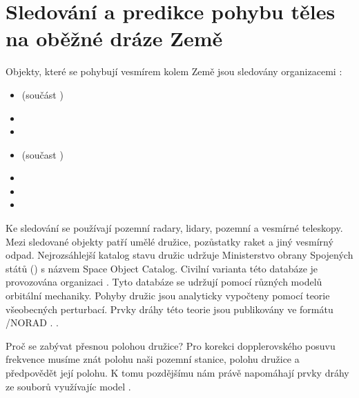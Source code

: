 \chapter[Sledování a predikce pohybu těles na oběžné dráze Země]{Sledování a predikce pohybu těles na oběžné dráze Země}

Objekty, které se pohybují vesmírem kolem Země jsou sledovány organizacemi \cite{wiki:derbis}:
\begin{itemize}
    \item {}(součást )
    \item {}
    \item {}
    \item {}(součast )
    \item {}
    \item {}
    \item {}
\end{itemize}

Ke sledování se používají pozemní radary, lidary, pozemní  a vesmírné teleskopy. Mezi sledované objekty patří umělé družice, pozůstatky raket a jiný vesmírný odpad. Nejrozsáhlejší katalog stavu družic udržuje Ministerstvo obrany Spojených států () s názvem Space Object Catalog. Civilní varianta této databáze je provozována organizaci . Tyto databáze se udržují pomocí různých modelů orbitální mechaniky. Pohyby družic jsou analyticky vypočteny pomocí teorie všeobecných perturbací. Prvky dráhy této teorie jsou publikovány ve formátu /NORAD . \cite{wiki:US_space_surv}.

Proč se zabývat přesnou polohou družice? Pro korekci dopplerovského posuvu frekvence musíme znát polohu naši pozemní stanice, polohu družice a předpovědět její polohu. K tomu pozdějšímu nám právě napomáhají prvky dráhy ze souborů  využívajíc model  \cite{wiki:TLE}.

\chapter{}
